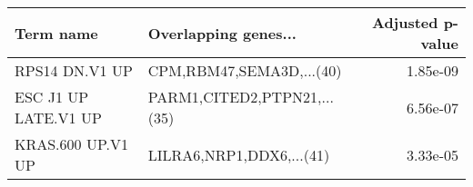 \begin{tabular}{llr}
\toprule
           Term name &        Overlapping genes... &  Adjusted p-value \\
\midrule
      RPS14 DN.V1 UP &    CPM,RBM47,SEMA3D,...(40) &          1.85e-09 \\
ESC J1 UP LATE.V1 UP & PARM1,CITED2,PTPN21,...(35) &          6.56e-07 \\
   KRAS.600 UP.V1 UP &    LILRA6,NRP1,DDX6,...(41) &          3.33e-05 \\
\bottomrule
\end{tabular}
